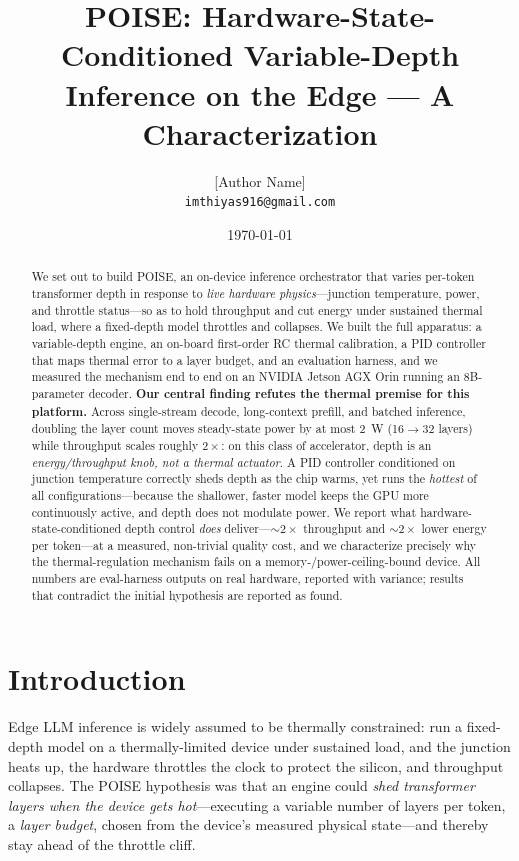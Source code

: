 \documentclass[11pt]{article}
\title{\textbf{POISE: Hardware-State-Conditioned Variable-Depth\\
Inference on the Edge --- A Characterization}}
\author{[Author Name]\\ \texttt{imthiyas916@gmail.com}}
\date{\today}
\begin{document}
\maketitle

\begin{abstract}
We set out to build POISE, an on-device inference orchestrator that varies per-token
transformer depth in response to \emph{live hardware physics}---junction temperature, power,
and throttle status---so as to hold throughput and cut energy under sustained thermal load,
where a fixed-depth model throttles and collapses. We built the full apparatus: a
variable-depth engine, an on-board first-order RC thermal calibration, a PID controller that
maps thermal error to a layer budget, and an evaluation harness, and we measured the mechanism
end to end on an NVIDIA Jetson AGX Orin running an 8B-parameter decoder. \textbf{Our central
finding refutes the thermal premise for this platform.} Across single-stream decode,
long-context prefill, and batched inference, doubling the layer count moves steady-state power
by at most \SI{2}{\watt} (16$\to$32 layers) while throughput scales roughly $2\times$: on this
class of accelerator, depth is an \emph{energy/throughput knob, not a thermal actuator}. A PID
controller conditioned on junction temperature correctly sheds depth as the chip warms, yet
runs the \emph{hottest} of all configurations---because the shallower, faster model keeps the
GPU more continuously active, and depth does not modulate power. We report what
hardware-state-conditioned depth control \emph{does} deliver---${\sim}2\times$ throughput and
${\sim}2\times$ lower energy per token---at a measured, non-trivial quality cost, and we
characterize precisely why the thermal-regulation mechanism fails on a
memory-/power-ceiling-bound device. All numbers are eval-harness outputs on real hardware,
reported with variance; results that contradict the initial hypothesis are reported as found.
\end{abstract}

\section{Introduction}
Edge LLM inference is widely assumed to be thermally constrained: run a fixed-depth model on a
thermally-limited device under sustained load, and the junction heats up, the hardware throttles
the clock to protect the silicon, and throughput collapses. The POISE hypothesis was that an
engine could \emph{shed transformer layers when the device gets hot}---executing a variable
number of layers per token, a \emph{layer budget}, chosen from the device's measured physical
state---and thereby stay ahead of the throttle cliff.
\end{document}
